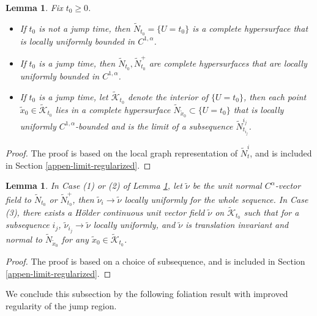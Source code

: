 \documentclass[11pt, letterpaper]{amsart}
\newtheorem{lem}[thm]{Lemma}
\theoremstyle{definition}
\theoremstyle{remark}
\begin{document}
\begin{lem}\label{lem-limit-surface-C1alpha}
	Fix $t_0\geq 0$. 
	\begin{itemize}
		\item[(1)] If $t_0$ is not a jump time, then $\tilde{N}_{t_0} = \{U =t_0\} $ is a complete hypersurface that is locally uniformly bounded in $C^{1,\alpha }$. 
		\item[(2)] If $t_0$ is a jump time, then $\tilde{N}_{t_0}, \tilde{N}^{+}_{t_0}$ are complete hypersurfaces that are locally uniformly bounded in $C^{1,\alpha }$. 
		\item[(3)] If $t_0$ is a jump time, let $\tilde{\mathcal{K}}_{t_0}$ denote the interior of $\{U= t_0\} $, then each point $\tilde{x}_0 \in \tilde{\mathcal{K}}_{t_0}$ lies in a complete hypersurface $\tilde{N}_{\tilde{x}_0} \subset \{ U=t_0\} $ that is locally uniformly $C^{1,\alpha }$-bounded and is the limit of a subsequence $\tilde{N}^{i_j}_{t_{i_j}}$.
	\end{itemize}
\end{lem}
\begin{proof}
	The proof is based on the local graph representation of $\tilde{N}^{i}_t$, and is included in Section \ref{appen-limit-regularized}.
\end{proof}

\begin{lem}\label{limit-nu-construction}
	In Case (1) or (2) of Lemma \ref{lem-limit-surface-C1alpha}, let $\tilde{\nu }$ be the unit normal $C^{\alpha }$-vector field to $\tilde{N}_{t_0}$ or $\tilde{N}_{t_0}^{+}$, then $\tilde{\nu }_i \to \tilde{\nu }$ locally uniformly for the whole sequence. In Case (3), there exists a H\"older continuous unit vector field $\tilde{\nu }$ on $\tilde{\mathcal{K}}_{t_0}$ such that for a subsequence $i_j$, $\tilde{\nu }_{i_j} \to \tilde{\nu }$ locally uniformly, and $\tilde{\nu }$ is translation invariant and normal to $\tilde{N}_{\tilde{x}_0}$ for any $\tilde{x}_0 \in \tilde{\mathcal{K}}_{t_0}$.
\end{lem}
\begin{proof}
	The proof is based on a choice of subsequence, and is included in Section \ref{appen-limit-regularized}.
\end{proof}


We conclude this subsection by the following foliation result with improved regularity of the jump region.
\end{document}

